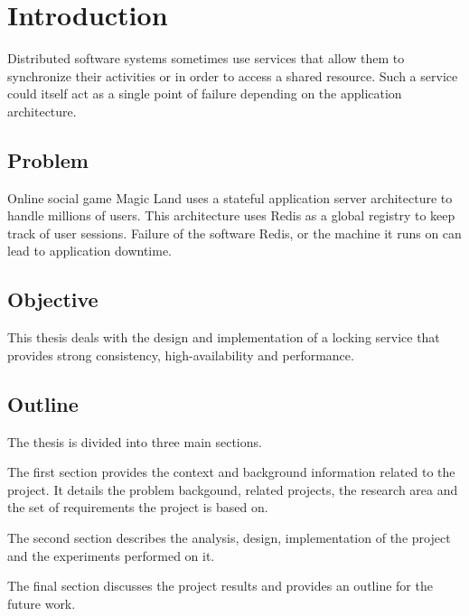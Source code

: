 \chapter{Introduction}
\label{chapter:introduction}

Distributed software systems sometimes use services that allow them to 
synchronize their activities or in order to access a shared resource. Such a
service could itself act as a single point of failure depending on the
application architecture.

\section{Problem}

Online social game Magic Land uses a stateful application server architecture to
handle millions of users. This architecture uses Redis as a global registry to
keep track of user sessions. Failure of the software Redis, or the machine it
runs on can lead to application downtime.

\section{Objective}

This thesis deals with the design and implementation of a locking service that
provides strong consistency, high-availability and performance.

\section{Outline}
The thesis is divided into three main sections.

The first section provides the context and background information related to the
project. It details the problem backgound, related projects, the research
area and the set of requirements the project is based on.

The second section describes the analysis, design, implementation of the project
and the experiments performed on it.

The final section discusses the project results and provides an outline for
the future work.

